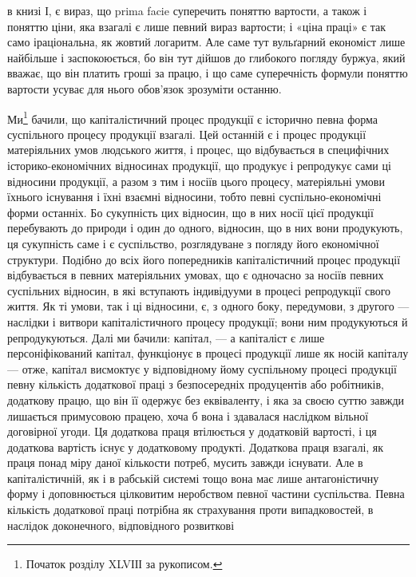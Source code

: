\parcont{}  %
в книзі І, є вираз, що prima facie суперечить поняттю вартости, а також
і поняттю ціни, яка взагалі є лише певний вираз вартости; і «ціна праці»
є так само іраціональна, як жовтий логаритм. Але саме тут вульґарний
економіст лише найбільше і заспокоюється, бо він тут дійшов до глибокого погляду
буржуа, який вважає, що він платить гроші за працю, і що саме суперечність
формули поняттю вартости усуває для нього обов’язок зрозуміти останню.

Ми\footnote{
Початок розділу XLVІІІ за рукописом.
} бачили, що капіталістичний процес продукції є історично певна
форма суспільного процесу продукції взагалі. Цей останній є і процес продукції
матеріяльних умов людського життя, і процес, що відбувається в специфічних
історико-економічних відносинах продукції, що продукує і репродукує сами
ці відносини продукції, а разом з тим і носіїв цього процесу, матеріяльні умови їхнього
існування і їхні взаємні відносини, тобто певні суспільно-економічні
форми останніх. Бо сукупність цих відносин, що в них носії цієї продукції перебувають
до природи і один до одного, відносин, що в них вони продукують, ця сукупність
саме і є суспільство, розглядуване з погляду його економічної структури.
Подібно до всіх його попередників капіталістичний процес продукції відбувається
в певних матеріяльних умовах, що є одночасно за носіїв певних суспільних
відносин, в які вступають індивідууми в процесі репродукції свого життя. Як
ті умови, так і ці відносини, є, з одного боку, передумови, з другого — наслідки
і витвори капіталістичного процесу продукції; вони ним продукуються й репродукуються.
Далі ми бачили: капітал, — а капіталіст є лише персоніфікований
капітал, функціонує в процесі продукції лише як носій капіталу — отже, капітал
висмоктує у відповідному йому суспільному процесі продукції певну кількість
додаткової праці з безпосередніх продуцентів або робітників, додаткову працю,
що він її одержує без еквіваленту, і яка за своєю суттю завжди лишається
примусовою працею, хоча б вона і здавалася наслідком вільної договірної угоди.
Ця додаткова праця втілюється у додатковій вартості, і ця додаткова вартість
існує у додатковому продукті. Додаткова праця взагалі, як праця понад міру
даної кількости потреб, мусить завжди існувати. Але в капіталістичній, як і в рабській
системі тощо вона має лише антагоністичну форму і доповнюється цілковитим
неробством певної частини суспільства. Певна кількість додаткової праці потрібна
як страхування проти випадковостей, в наслідок доконечного, відповідного розвиткові
